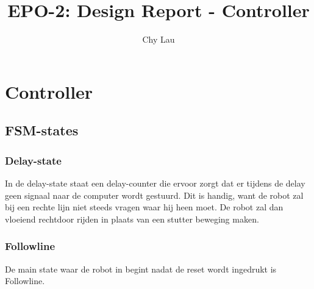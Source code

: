 \documentclass{report}
\title{EPO-2: Design Report - Controller}
\author{Chy Lau}
\begin{document}
\chapter{Controller}
\label{ch:controller}

\section{FSM-states}

\subsection{Delay-state}
In de delay-state staat een delay-counter die ervoor zorgt dat er tijdens de delay geen signaal naar de computer wordt gestuurd. Dit is handig, want de robot zal bij een rechte lijn niet steeds vragen waar hij heen moet. De robot zal dan vloeiend rechtdoor rijden in plaats van een stutter beweging maken. 

\subsection{Followline}
De main state waar de robot in begint nadat de reset wordt ingedrukt is Followline. 
\end{document}
